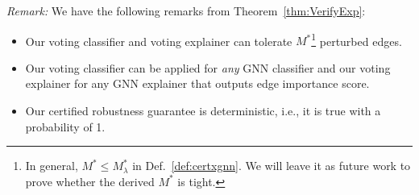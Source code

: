 \emph{Remark:} We have the following remarks from Theorem~\ref{thm:VerifyExp}:
\begin{itemize}[leftmargin=*]
\vspace{-2mm}
\item Our voting classifier and voting explainer can tolerate  $M^*$\footnote{{In general, $M^* \leq M^*_\lambda$ in Def.~\ref{def:certxgnn}. 
We will leave it as future work to prove whether the derived $M^*$ is tight. 
}} perturbed edges. 

\item Our voting classifier can be applied for \emph{any} GNN classifier and our voting explainer for any GNN explainer that outputs edge importance score.

\item Our certified robustness guarantee is deterministic, i.e., it is true with a probability of 1.  

\end{itemize}

